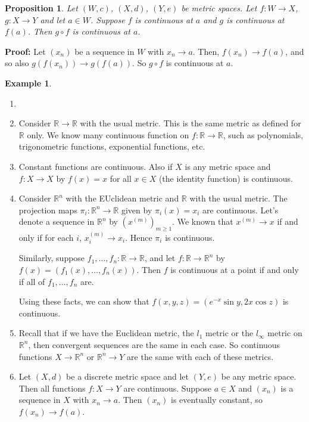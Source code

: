 \documentclass[12pt]{article}
\newtheorem{proposition}{Proposition}[section]
\theoremstyle{definition}
\newtheorem{example}{Example}[section]
\theoremstyle{remark}
\begin{document}
\begin{proposition}
	Let $(W, c)$, $(X, d)$, $(Y, e)$ be metric spaces. Let $f : W \to X$, $g : X \to Y$ and let $a \in W$. Suppose $f$ is continuous at $a$ and $g$ is continuous at $f(a)$. Then $g \circ f$ is continuous at $a$.
\end{proposition}

\begin{adjustbox}{minipage = \columnwidth - 25.5pt, margin=1em, frame=1pt, margin=0em}
	\textbf{Proof:} Let $(x_n)$ be a sequence in $W$ with $x_n \to a$. Then, $f(x_n) \to f(a)$, and so also $g(f(x_n)) \to g(f(a))$. So $g \circ f$ is continuous at $a$.
\end{adjustbox}

\begin{adjustbox}{minipage = \columnwidth - 25.5pt, margin=1em, frame=1pt, margin=0em}
\begin{example}
	\begin{enumerate}[1.]
		\item[]
		\item Consider $\mathbb{R} \to \mathbb{R}$ with the usual metric. This is the same metric as defined for $\mathbb{R}$ only. We know many continuous function on $f : \mathbb{R} \to \mathbb{R}$, such as polynomials, trigonometric functions, exponential functions, etc.
		\item Constant functions are continuous. Also if $X$ is any metric space and $f : X \to X$ by $f(x) = x$ for all $x \in X$ (the identity function) is continuous.
		\item Consider $\mathbb{R}^{n}$ with the EUclidean metric and $\mathbb{R}$ with the usual metric. The projection maps $\pi_i : \mathbb{R}^{n} \to \mathbb{R}$ given by $\pi_i(x) = x_i$ are continuous. Let's denote a sequence in $\mathbb{R}^{n}$ by $(x^{(m)})_{m \geq 1}$. We known that $x^{(m)} \to x$ if and only if for each $i$, $x_i^{(m)}\to x_i$. Hence $\pi_i$ is continuous.

			Similarly, suppose $f_1, \ldots, f_n : \mathbb{R}\to \mathbb{R}$, and let $f : \mathbb{R} \to \mathbb{R}^{n}$ by $f(x) = (f_1(x), \ldots, f_n(x))$. Then $f$ is continuous at a point if and only if all of $f_1, \ldots, f_n$ are.

			Using these facts, we can show that $f(x, y, z) = (e^{-x}\sin y, 2 x \cos z)$ is continuous.
		\item Recall that if we have the Euclidean metric, the $l_1$ metric or the $l_{\infty}$ metric on $\mathbb{R}^{n}$, then convergent sequences are the same in each case. So continuous functions $X \to \mathbb{R}^{n}$ or $\mathbb{R}^{n} \to Y$ are the same with each of these metrics.
		\item Let $(X, d)$ be a discrete metric space and let $(Y, e)$ be any metric space. Then all functions $f : X \to Y$ are continuous. Suppose $a \in X$ and $(x_n)$ is a sequence in $X$ with $x_n \to a$. Then $(x_n)$ is eventually constant, so $f(x_n) \to f(a)$.
	\end{enumerate}
	
\end{example}

\end{adjustbox}
\end{document}
